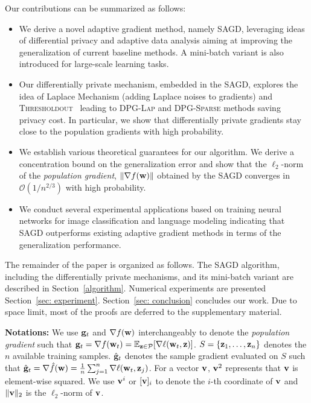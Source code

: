 \documentclass[11pt]{article}
\begin{document}
Our  contributions  can be summarized as follows:
\begin{itemize}
\item We derive a novel adaptive gradient method, namely \textsc{SAGD}, leveraging ideas of differential privacy and adaptive data analysis aiming at improving the generalization of current baseline methods. A mini-batch variant is also introduced for large-scale learning tasks.
\item Our differentially private mechanism, embedded in the \textsc{SAGD}, explores the idea of Laplace Mechanism (adding Laplace noises to gradients) and \textsc{Thresholdout}~\citep{dwro2014} leading to \textsc{DPG-Lap} and \textsc{DPG-Sparse} methods saving privacy cost. 
In particular, we show that differentially private gradients stay close to the population gradients with high probability. 
\item We establish various theoretical guarantees for our algorithm. We derive a concentration bound on the generalization error and show that the $\ell_2$-norm of the \emph{population gradient}, \ie $\|\nabla f(\mathbf{w})\|$ obtained by the \textsc{SAGD} converges in $\mathcal{O}(1/n^{2/3})$ with high probability. 
\item We conduct several experimental applications based on training neural networks for image classification and language modeling indicating that \textsc{SAGD} outperforms existing adaptive gradient methods in terms of the generalization performance.
\end{itemize}
The remainder of the paper is organized as follows.
The \textsc{SAGD} algorithm, including the differentially private mechanisms, and its mini-batch variant are described in Section~\ref{algorithm}. 
Numerical experiments are presented Section~\ref{sec: experiment}. 
Section~\ref{sec: conclusion} concludes our work. 
Due to space limit, most of the proofs are deferred to the supplementary material.

\textbf{Notations:} 
We use $\mathbf{g}_t$ and $\nabla f(\mathbf{w})$ interchangeably to denote the \emph{population gradient} such that $\g_t = \nabla f(\w_t) = \mathbb{E}_{\z \in \cP} [\nabla \ell(\w_t, \z)]$. $S = \left\{\mathbf{z}_{1}, \dots, \mathbf{z}_{n}\right\}$
denotes the $n$ available training samples. $\hat {\mathbf{g}}_t$ denotes the sample gradient evaluated on $S$ such that $\hat {\mathbf{g}}_t = \nabla \hat f(\mathbf{w}) = \frac{1}{n}\sum_{j=1}^n \nabla \ell(\mathbf{w}_t, \mathbf{z}_j)$. For a vector $\mathbf{v}$, $\mathbf{v}^2$ represents that $\mathbf{v}$ is element-wise squared.  We use $\mathbf{v}^i$ or $[\mathbf{v}]_i$ to denote the $i$-th coordinate of $\mathbf{v}$ and $\|\mathbf{v}\|_2$ is the $\ell_2$-norm of $\mathbf{v}$.
\end{document}
